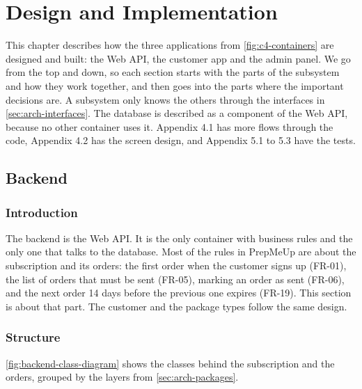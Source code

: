 \chapter{Design and Implementation}\label{ch:design}

This chapter describes how the three applications from \autoref{fig:c4-containers} are
designed and built: the Web API, the customer app and the admin panel. We go from the
top and down, so each section starts with the parts of the subsystem and how they work
together, and then goes into the parts where the important decisions are. A subsystem
only knows the others through the interfaces in \autoref{sec:arch-interfaces}. The
database is described as a component of the Web API, because no other container uses it.
Appendix 4.1 has more flows through the code, Appendix 4.2 has the screen design, and
Appendix 5.1 to 5.3 have the tests.

\section{Backend}\label{sec:design-backend}

\subsection{Introduction}

The backend is the Web API. It is the only container with business rules and the only
one that talks to the database. Most of the rules in PrepMeUp are about the subscription
and its orders: the first order when the customer signs up (FR-01), the list of orders
that must be sent (FR-05), marking an order as sent (FR-06), and the next order 14 days
before the previous one expires (FR-19). This section is about that part. The customer
and the package types follow the same design.

\subsection{Structure}

\autoref{fig:backend-class-diagram} shows the classes behind the subscription and the
orders, grouped by the layers from \autoref{sec:arch-packages}.


